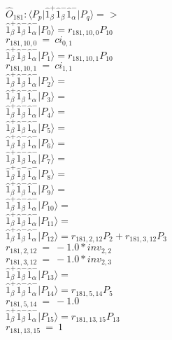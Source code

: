 \documentclass[14pt]{article}
\begin{document}
    $\hat{O}_{181}:  \langle{P_p}\vert \hat{1}_{\beta}^{+}\hat{1}_{\beta}^{-}\hat{1}_{\alpha}^{-} \vert{P_q}\rangle => $ \\ 
    $ \hat{1}_{\beta}^{+}\hat{1}_{\beta}^{-}\hat{1}_{\alpha}^{-} \vert{P_{0}}\rangle = {r}_{181,10,0}P_{10} $ \\ 
    ${r}_{181,10,0}\ =\ {ci}_{0,1} $ \\ 
    $ \hat{1}_{\beta}^{+}\hat{1}_{\beta}^{-}\hat{1}_{\alpha}^{-} \vert{P_{1}}\rangle = {r}_{181,10,1}P_{10} $ \\ 
    ${r}_{181,10,1}\ =\ {ci}_{1,1} $ \\ 
    $ \hat{1}_{\beta}^{+}\hat{1}_{\beta}^{-}\hat{1}_{\alpha}^{-} \vert{P_{2}}\rangle =  $ \\ 
    $ \hat{1}_{\beta}^{+}\hat{1}_{\beta}^{-}\hat{1}_{\alpha}^{-} \vert{P_{3}}\rangle =  $ \\ 
    $ \hat{1}_{\beta}^{+}\hat{1}_{\beta}^{-}\hat{1}_{\alpha}^{-} \vert{P_{4}}\rangle =  $ \\ 
    $ \hat{1}_{\beta}^{+}\hat{1}_{\beta}^{-}\hat{1}_{\alpha}^{-} \vert{P_{5}}\rangle =  $ \\ 
    $ \hat{1}_{\beta}^{+}\hat{1}_{\beta}^{-}\hat{1}_{\alpha}^{-} \vert{P_{6}}\rangle =  $ \\ 
    $ \hat{1}_{\beta}^{+}\hat{1}_{\beta}^{-}\hat{1}_{\alpha}^{-} \vert{P_{7}}\rangle =  $ \\ 
    $ \hat{1}_{\beta}^{+}\hat{1}_{\beta}^{-}\hat{1}_{\alpha}^{-} \vert{P_{8}}\rangle =  $ \\ 
    $ \hat{1}_{\beta}^{+}\hat{1}_{\beta}^{-}\hat{1}_{\alpha}^{-} \vert{P_{9}}\rangle =  $ \\ 
    $ \hat{1}_{\beta}^{+}\hat{1}_{\beta}^{-}\hat{1}_{\alpha}^{-} \vert{P_{10}}\rangle =  $ \\ 
    $ \hat{1}_{\beta}^{+}\hat{1}_{\beta}^{-}\hat{1}_{\alpha}^{-} \vert{P_{11}}\rangle =  $ \\ 
    $ \hat{1}_{\beta}^{+}\hat{1}_{\beta}^{-}\hat{1}_{\alpha}^{-} \vert{P_{12}}\rangle = {r}_{181,2,12}P_{2}+{r}_{181,3,12}P_{3} $ \\ 
    ${r}_{181,2,12}\ =\ -1.0*{inv}_{2,2} $ \\ 
    ${r}_{181,3,12}\ =\ -1.0*{inv}_{2,3} $ \\ 
    $ \hat{1}_{\beta}^{+}\hat{1}_{\beta}^{-}\hat{1}_{\alpha}^{-} \vert{P_{13}}\rangle =  $ \\ 
    $ \hat{1}_{\beta}^{+}\hat{1}_{\beta}^{-}\hat{1}_{\alpha}^{-} \vert{P_{14}}\rangle = {r}_{181,5,14}P_{5} $ \\ 
    ${r}_{181,5,14}\ =\ -1.0 $ \\ 
    $ \hat{1}_{\beta}^{+}\hat{1}_{\beta}^{-}\hat{1}_{\alpha}^{-} \vert{P_{15}}\rangle = {r}_{181,13,15}P_{13} $ \\ 
    ${r}_{181,13,15}\ =\ 1 $ \\ 
    
\end{document}
